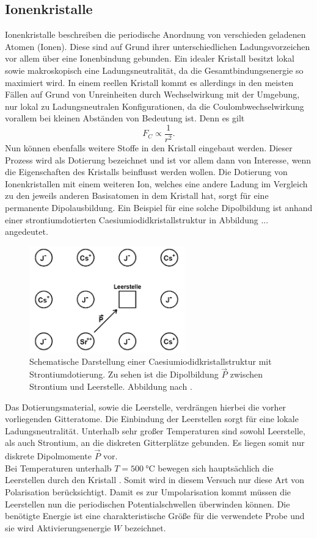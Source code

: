 \subsection{Ionenkristalle}
Ionenkristalle beschreiben die periodische Anordnung von verschieden geladenen Atomen (Ionen). Diese sind auf Grund ihrer unterschiedlichen Ladungsvorzeichen vor allem über eine Ionenbindung 
gebunden. Ein idealer Kristall besitzt lokal sowie makroskopisch eine Ladungsneutralität, da die Gesamtbindungsenergie so maximiert wird. In einem reellen Kristall kommt es allerdings in den meisten Fällen auf Grund von 
Unreinheiten durch Wechselwirkung mit der Umgebung,
nur lokal zu Ladungsneutralen Konfigurationen, da die Coulombwechselwirkung vorallem bei kleinen Abständen von Bedeutung ist. Denn es gilt
\begin{equation*}
F_{C} \propto \frac{1}{r^2}.
\end{equation*}
\newline
Nun können ebenfalls weitere Stoffe in den Kristall eingebaut werden. Dieser Prozess wird als Dotierung bezeichnet und ist vor allem dann von Interesse, wenn die Eigenschaften des Kristalls 
beinflusst werden wollen. Die Dotierung von Ionenkristallen mit einem weiteren Ion, welches eine andere Ladung im Vergleich zu den jeweils anderen Basisatomen in dem Kristall hat, sorgt für eine permanente Dipolausbildung.
Ein Beispiel für eine solche Dipolbildung ist anhand einer strontiumdotierten Caesiumiodidkristallstruktur in Abbildung ... angedeutet.
\begin{figure}
    \centering
    \includegraphics[width=0.6\textwidth]{bilder/theo1.png}
    \caption{Schematische Darstellung einer Caesiumiodidkristallstruktur mit Strontiumdotierung. Zu sehen ist die Dipolbildung $\vec{P}$ zwischen Strontium und Leerstelle. Abbildung nach \cite{altskript}.
            }
    \label{fig:theo1}
\end{figure}
Das Dotierungsmaterial, sowie die Leerstelle, verdrängen hierbei die vorher vorliegenden Gitteratome. Die Einbindung der Leerstellen sorgt für eine lokale Ladungsneutralität. Unterhalb sehr großer Temperaturen sind
sowohl Leerstelle, als auch Strontium, an die diskreten Gitterplätze gebunden. Es liegen somit nur diskrete Dipolmomente $\vec{P}$ vor.
\\
Bei Temperaturen unterhalb $T = \SI{500}{\celsius}$ bewegen sich hauptsächlich die Leerstellen durch den Kristall \cite{altskript}. Somit wird in diesem Versuch nur diese Art von Polarisation berücksichtigt.
Damit es zur Umpolarisation kommt müssen die Leerstellen nun die periodischen Potentialschwellen überwinden können. Die benötigte Energie ist eine charakteristische Größe für die verwendete Probe und 
sie wird Aktivierungsenergie $W$ bezeichnet.

